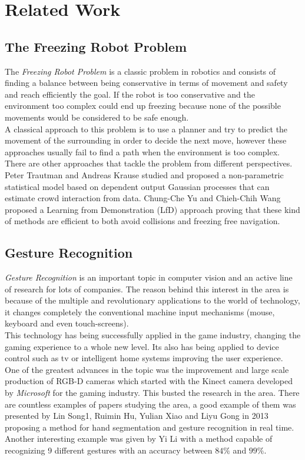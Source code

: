 \section{Related Work}
\label{sec:re_work}

\subsection{The Freezing Robot Problem}
The \emph{Freezing Robot Problem} is a classic problem in robotics and consists of finding a balance between being conservative in terms of movement and safety and reach efficiently the goal. If the robot is too conservative and the environment too complex could end up freezing because none of the possible movements would be considered to be safe enough. \\

A classical approach to this problem is to use a planner and try to predict the movement of the surrounding in order to decide the next move, however these approaches usually fail to find a path when the environment is too complex. There are other approaches that tackle the problem from different perspectives. Peter Trautman and Andreas Krause \cite{conf/iros/TrautmanK10} studied and proposed a non-parametric statistical model based on dependent output Gaussian processes that can estimate crowd interaction from data. Chung-Che Yu and Chieh-Chih Wang \cite{6395022} proposed a Learning from Demonstration (LfD) approach proving that these kind of methods are efficient to both avoid collisions and freezing free navigation.

\subsection{Gesture Recognition}
\emph{Gesture Recognition} is an important topic in computer vision and an active line of research for lots of companies. The reason behind this interest in the area is because of the multiple and revolutionary applications to the world of technology, it changes completely the conventional machine input mechanisms (mouse, keyboard and even touch-screens).\\

This technology has being successfully applied in the game industry, changing the gaming experience to a whole new level. Its also has being applied to device control such as tv or intelligent home systems improving the user experience.\\

One of the greatest advances in the topic was the improvement and large scale production of RGB-D cameras which started with the Kinect camera developed by \emph{Microsoft} for the gaming industry. This busted the research in the area. There are countless examples of papers studying the area, a good example of them was presented by Lin Song1, Ruimin Hu, Yulian Xiao and Liyu Gong \cite{LinSong} in 2013 proposing a method for hand segmentation and gesture recognition in real time. Another interesting example was given by Yi Li \cite{6269439} with a method capable of recognizing 9 different gestures with an accuracy between $84\%$ and $99\%$. 
